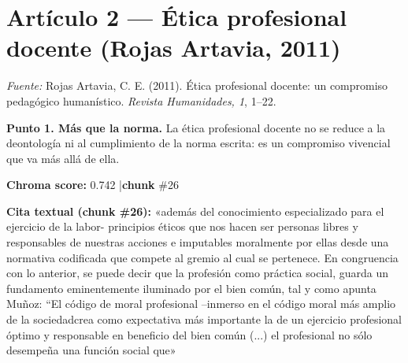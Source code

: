 \documentclass[11pt]{article}
\newcommand{\score}[2]{{\small\textbf{Chroma score:} #1 \quad|\quad \textbf{chunk} \##2}}
\begin{document}
\section*{Art\'iculo 2 --- \'Etica profesional docente (Rojas Artavia, 2011)}
{\small\textit{Fuente: }Rojas Artavia, C. E. (2011). \'Etica profesional docente: un compromiso pedag\'ogico human\'istico. \textit{Revista Humanidades, 1}, 1--22.}\par\vspace{0.4em}
\noindent\textbf{Punto 1. M\'as que la norma.} La \'etica profesional docente no se reduce a la deontolog\'ia ni al cumplimiento de la norma escrita: es un compromiso vivencial que va m\'as all\'a de ella.\par
\score{0.742}{26}\par\smallskip
{}\par\smallskip
\begin{mdframed}[backgroundcolor=qbg,linecolor=qrule,linewidth=1pt,leftline=true,topline=false,bottomline=false,rightline=false,innerleftmargin=8pt,innertopmargin=6pt,innerbottommargin=6pt]
{\small\textbf{Cita textual (chunk \#26):} «además del conocimiento especializado para el ejercicio de la labor- principios éticos que nos hacen ser personas libres y responsables de nuestras acciones e imputables moralmente por ellas desde una normativa codificada que compete al gremio al cual se pertenece. En congruencia con lo anterior, se puede decir que la profesión como práctica social, guarda un fundamento eminentemente iluminado por el bien común, tal y como apunta Muñoz: ``El código de moral profesional --inmerso en el código moral más amplio de la sociedadcrea como expectativa más importante la de un ejercicio profesional óptimo y responsable en beneficio del bien común (...) el profesional no sólo desempeña una función social que»}
\end{mdframed}
\par
\end{document}
